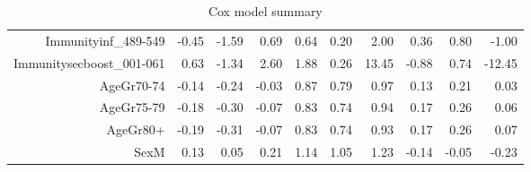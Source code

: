 \begin{table}[ht]
\begin{tabular}{rrrrrrrrrr}
  Immunityinf\_489-549 & -0.45 & -1.59 & 0.69 & 0.64 & 0.20 & 2.00 & 0.36 & 0.80 & -1.00 \\ 
  Immunitysecboost\_001-061 & 0.63 & -1.34 & 2.60 & 1.88 & 0.26 & 13.45 & -0.88 & 0.74 & -12.45 \\ 
  AgeGr70-74 & -0.14 & -0.24 & -0.03 & 0.87 & 0.79 & 0.97 & 0.13 & 0.21 & 0.03 \\ 
  AgeGr75-79 & -0.18 & -0.30 & -0.07 & 0.83 & 0.74 & 0.94 & 0.17 & 0.26 & 0.06 \\ 
  AgeGr80+ & -0.19 & -0.31 & -0.07 & 0.83 & 0.74 & 0.93 & 0.17 & 0.26 & 0.07 \\ 
  SexM & 0.13 & 0.05 & 0.21 & 1.14 & 1.05 & 1.23 & -0.14 & -0.05 & -0.23 \\ 
   \hline
\end{tabular}
\caption{Cox model summary} 
\end{table}
